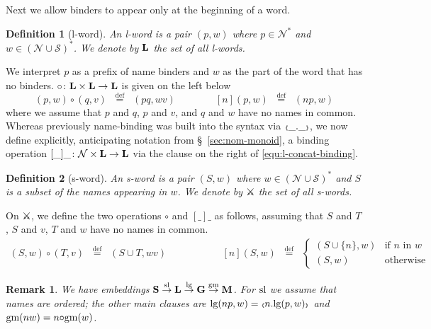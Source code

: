 \documentclass[runningheads,a4paper]{llncs}
\newcommand{\oscope}{\mbox{\tiny$\langle\!\!\langle$}}
\newcommand{\cscope}{\mbox{\tiny$\rangle\!\!\rangle$}}
\newcommand{\mmdef}{\mbox{$\;\;\stackrel{\mathrm{def}}{=}\;\;$}}
\newcommand{\names}{\mbox{$\mathcal{N}$}}
\newcommand{\namestar}{\mbox{$\mathcal{N^\ast}$}}
\newtheorem{definition}{Theorem}[section]
\newtheorem{remark}{Theorem}[section]
\newtheorem{definition}{Definition}[section]
\newtheorem{remark}{Remark}[section]
\begin{document}
Next we allow binders to appear only at the beginning of a word.
\begin{definition}[l-word]
  An \emph{l-word} is a pair $(p,w)$ where $p\in\namestar$ and
  $w\in(\names\cup\mathcal{S})^\ast$. We denote by $\mathbf{L}$ the set
  of all l-words.
\end{definition}
We interpret $p$ as a prefix of name binders and $w$ as the part of
the word that has no binders.
$\circ\colon \mathbf{L}\times\mathbf{L}\to\mathbf{L}$ is given
on the left below 
\begin{equation}\label{equ:l-concat-binding}
(p,w){\circ}(q,v) \mmdef (pq,wv)\quad\quad\quad\quad [n](p,w) \mmdef (np,w)
\end{equation}
where we assume that $p$ and $q$, $p$ and $v$, and $q$ and $w$ have no
names in common.
Whereas previously name-binding was built into the syntax via $\oscope
\_ .\_ \cscope$, we now define explicitly, anticipating notation from
\S~\ref{sec:nom-monoid}, a binding operation $[\_]\_\colon
\names\times\lwords\to\lwords$ via the clause on the right of
\eqref{equ:l-concat-binding}.

\begin{definition}[s-word]
  An \emph{s-word} is a pair $(S,w)$ where
  $w\in(\names{\cup}\mathcal{S})^\ast$ and $S$ is a subset of the
  names appearing in $w$. We denote by $\swords$ the set of all
  s-words.
\end{definition}
On $\swords$, we define the two operations $\circ$ and $[\_]\_$ as
follows, assuming that $S$ and $T$, $S$ and $v$, $T$ and $w$ have no
names in common.
\begin{equation}\label{equ:s-concat-binding}
\begin{array}{ccc}
(S,w){\circ}(T,v) \mmdef (S\cup T, wv) &\quad\quad\quad\quad &
  [n](S,w) \mmdef \begin{cases}(S\cup\{n\},w) & \text{if $n$ 
      in $w$}\\ (S,w) & \text{otherwise}\end{cases}
\end{array}
\end{equation}


\begin{remark}\label{rmk:slgm}
We have embeddings 
$\mathbf{S}\stackrel{\mathrm{sl}}{\to}
\mathbf{L}\stackrel{\mathrm{lg}}{\to}
\mathbf{G}\stackrel{\mathrm{gm}}{\to}
\mathbf{M}$.
For $\mathrm{sl}$ we assume that names are ordered; the other main clauses
are $\lgtr(np,w)=\oscope n.\lgtr(p,w)\cscope$ and
$\mathrm{gm}(nw)=n{\circ}\mathrm{gm}(w)$.
\end{remark}
\end{document}
